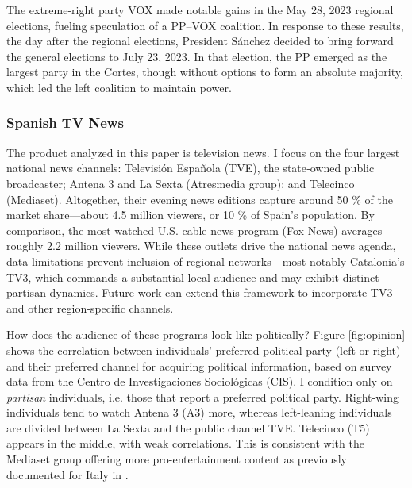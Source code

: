 \documentclass[12pt]{article}
\begin{document}
	
	 The extreme-right party VOX made notable gains in the May 28, 2023 regional elections, fueling speculation of a PP–VOX coalition. In response to these results, the day after the regional elections, President Sánchez decided to bring forward the general elections to July 23, 2023. In that election, the PP emerged as the largest party in the Cortes, though without options to form an absolute majority, which led  the left coalition to maintain power. 
	
	
	
	
	
	
	
	
	
	
	\subsubsection*{Spanish TV News}
	
	
	The product analyzed in this paper is television news. I focus on the four largest national news channels: Televisión Española (TVE), the state‐owned public broadcaster; Antena 3 and La Sexta (Atresmedia group); and Telecinco (Mediaset). Altogether, their evening news editions capture around 50 \% of the market share—about 4.5 million viewers, or 10 \% of Spain’s population. By comparison, the most‐watched U.S. cable‐news program (Fox News) averages roughly 2.2 million  viewers. While these outlets drive the national news agenda, data limitations prevent inclusion of regional networks—most notably Catalonia’s TV3, which commands a substantial local audience and may exhibit distinct partisan dynamics. Future work can extend this framework to incorporate TV3 and other region‐specific channels.  
	


How does the audience of these programs look like politically?	Figure \ref{fig:opinion} shows the correlation between individuals' preferred political party (left or right) and their preferred channel for acquiring political information, based on survey data from the Centro de Investigaciones Sociológicas (CIS). I condition only on \textit{partisan} individuals, i.e. those that report a preferred political party. Right-wing individuals  tend to watch Antena 3 (A3) more, whereas left-leaning individuals are divided between La Sexta and the public channel TVE. Telecinco (T5)  appears in the middle, with weak correlations. This is consistent with the Mediaset group offering more pro-entertainment content as previously documented for Italy in \cite{durante_aer}.
\end{document}

